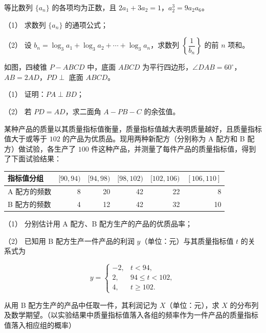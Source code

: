 \begin{question}
等比数列 $\{a_n\}$ 的各项均为正数，且 $2a_1+3a_2=1$，$a_2^3=9a_2a_6$。

（1） 求数列 $\{a_n\}$ 的通项公式；

（2） 设 $b_n=\log_3a_1+\log_3a_2+\cdots+\log_3a_n$，求数列 $\left\{\dfrac1{b_n}\right\}$ 的前 $n$ 项和。

\Needspace{0.4\textheight}
\end{question}
\begin{question}
如图，四棱锥 $P-ABCD$ 中，底面 $ABCD$ 为平行四边形，$\angle DAB=60^\circ$，$AB=2AD$，$PD\perp$ 底面 $ABCD$。
\nopagebreak[4]
\begin{center}\end{center}
\nopagebreak[4]
（1） 证明：$PA\perp BD$；

（2） 若 $PD=AD$，求二面角 $A-PB-C$ 的余弦值。

\end{question}
\begin{question}
某种产品的质量以其质量指标值衡量，质量指标值越大表明质量越好，且质量指标值大于或等于 $102$ 的产品为优质品。现用两种新配方（分别称为 A 配方和 B 配方）做试验，各生产了 $100$ 件这种产品，并测量了每件产品的质量指标值，得到了下面试验结果：

\begin{center}
\begin{tabular}{lrrrrr}
\toprule
指标值分组 & $[90,94)$ & $[94,98)$ & $[98,102)$ & $[102,106)$ & $[106,110]$ \\
\midrule
A 配方的频数 & 8 & 20 & 42 & 22 & 8 \\
B 配方的频数 & 4 & 12 & 42 & 32 & 10 \\
\bottomrule
\end{tabular}
\end{center}

（1） 分别估计用 A 配方、B 配方生产的产品的优质品率；

（2） 已知用 B 配方生产一件产品的利润 $y$（单位：元）与其质量指标值 $t$ 的关系式为

\nopagebreak[4]
\[
y=\begin{cases}
-2,&t<94,\\
2,&94\leq t<102,\\
4,&t\geq102.
\end{cases}
\]

从用 B 配方生产的产品中任取一件，其利润记为 $X$（单位：元），求 $X$ 的分布列及数学期望。（以实验结果中质量指标值落入各组的频率作为一件产品的质量指标值落入相应组的概率）

\end{question}
